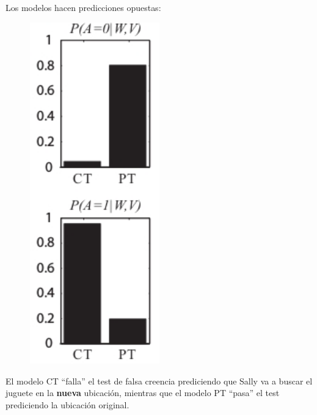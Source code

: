 \documentclass{beamer}
\begin{document}
\begin{frame}

Los modelos hacen predicciones opuestas: 
%

%


\begin{minipage}{0.5\textwidth}
\begin{figure}[H]
	\includegraphics[width=0.5\textwidth]{imagenes/fig_b.jpg}
\end{figure}
\end{minipage} \hfill
\begin{minipage}{0.45\textwidth}
El modelo CT ``falla''   el test de falsa creencia prediciendo que Sally va a buscar el juguete en la \textbf{nueva} ubicación, mientras que el modelo PT ``pasa''   el test prediciendo la ubicación original.
\end{minipage}



\end{frame}
\end{document}
